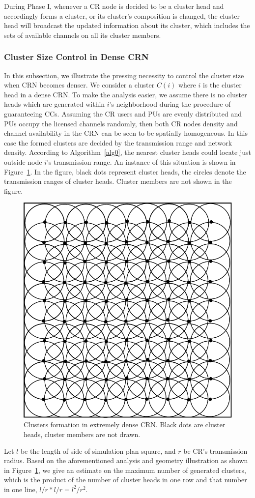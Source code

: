 \documentclass[times]{ettauth}
\theoremstyle{mytheoremstyle}
\theoremstyle{mytheoremstyle}
\theoremstyle{mytheoremstyle}
\begin{document}
During Phase I, whenever a CR node is decided to be a cluster head and accordingly forms a cluster, or its cluster's composition is changed, the cluster head will broadcast the updated information about its cluster, which includes the sets of available channels on all its cluster members.


\subsubsection{Cluster Size Control in Dense CRN}
\label{ross_p2_cluster_pruning}
In this subsection, we illustrate the pressing necessity to control the cluster size when CRN becomes denser.
We consider a cluster $C(i)$ where $i$ is the cluster head in a dense CRN. 
To make the analysis easier, we assume there is no cluster heads which are generated within $i$'s neighborhood during the procedure of guaranteeing CCs.
Assuming the CR users and PUs are evenly distributed and PUs occupy the licensed channels randomly, then both CR nodes density and channel availability in the CRN can be seen to be spatially homogeneous.
In this case the formed clusters are decided by the transmission range and network density.
According to Algorithm~\ref{alg0}, the nearest cluster heads could locate just outside node $i$'s transmission range.
%
An instance of this situation is shown in Figure~\ref{clusters_denseNetwork}.
In the figure, black dots represent cluster heads, the circles denote the transmission ranges of cluster heads.
Cluster members are not shown in the figure.
\begin{figure}[h!]
  \centering
  \includegraphics[width=0.3\linewidth]{clusters_denseNetwork_2.pdf}
  \caption{Clusters formation in extremely dense CRN. Black dots are cluster heads, cluster members are not drawn.}
  \label{clusters_denseNetwork}
\end{figure}
Let $l$ be the length of side of simulation plan square, and $r$ be CR's transmission radius.
Based on the aforementioned analysis and geometry illustration as shown in Figure~\ref{clusters_denseNetwork}, we give an estimate on the maximum number of generated clusters, which is the product of the number of cluster heads in one row and that number in one line, $l/r * l/r = l^2/r^2$.
\end{document}
